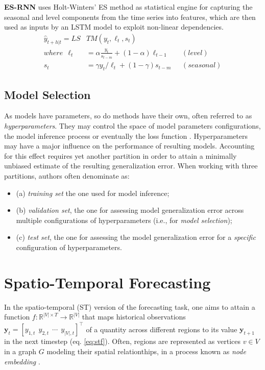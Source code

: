 \vspace{1em}
\noindent
\textbf{ES-RNN} uses Holt-Winters' ES method as statistical engine for capturing the seasonal and level components from the time series into features, which are then used as inputs by an LSTM model to exploit non-linear dependencies.
\begin{equation}\label{eq:esrnn}
    \begin{aligned}
    \hat{y}_{t+h|t} = LS&TM(y_t,\ell_t, s_t)\\
    where \ \ \ell_t &= \alpha \frac{y_t}{s_{t-m}} + (1-\alpha)\ell_{t-1}   &(level) \\
    s_t &= \gamma y_t/\ell_{t} + (1-\gamma)s_{t-m} \ \ \ &(seasonal)
    \end{aligned}
\end{equation}

\subsection{Model Selection}\label{subsec:modelselection}

As models have parameters, so do methods have their own, often referred to as \textit{hyperparameters}. They may control the space of model parameters configurations, the model inference process or eventually the loss function \cite{hutter2019automated}. Hyperparameters may have a major influence on the performance of resulting models. Accounting for this effect requires yet another partition in order to attain a minimally unbiased estimate of the resulting generalization error.
When working with three partitions, authors often denominate as:
\begin{itemize}
    \item (a) \textit{training set} the one used for model inference;
    \item (b) \textit{validation set}, the one for assessing model generalization error across multiple configurations of hyperparameters (i.e., for \textit{model selection});
    \item (c) \textit{test set}, the one for assessing the model generalization error for a \textit{specific} configuration of hyperparameters.
\end{itemize}

\pagebreak

\section{Spatio-Temporal Forecasting}\label{sec:stf}
In the spatio-temporal (ST) version of the forecasting task, one aims to attain a function $f: \mathbb{R}^{|V|\times T} \rightarrow \mathbb{R}^{|V|}$ that maps historical observations $\boldsymbol{y}_t = [y_{1,t}\  \  y_{2,t}\ \ \cdots \ \ y_{|V|,t}]^\top$ of a quantity across different regions to its value $\boldsymbol{y}_{t+1}$ in the next timestep  (eq. \ref{eq:stf}).
Often, regions are represented as vertices $v\in V$ in a graph $G$ modeling their spatial relationthips, in a process known as \textit{node embedding} \cite{liu2020intro}.

